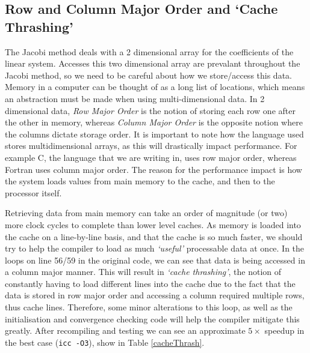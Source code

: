 \documentclass[10pt,twocolumn,a4paper]{article}
\begin{document}
\subsection{Row and Column Major Order and `Cache Thrashing'}
The Jacobi method deals with a 2 dimensional array for the coefficients of the linear system. Accesses this two dimensional array are prevalant throughout the Jacobi method, so we need to be careful about how we store/access this data. Memory in a computer can be thought of as a long list of locations, which means an abstraction must be made when using multi-dimensional data. In 2 dimensional data, \textit{Row Major Order} is the notion of storing each row one after the other in memory, whereas \textit{Column Major Order} is the opposite notion where the columns dictate storage order. It is important to note how the language used stores multidimensional arrays, as this will drastically impact performance. For example C, the language that we are writing in, uses row major order, whereas Fortran uses column major order. The reason for the performance impact is how the system loads values from main memory to the cache, and then to the processor itself. \par

Retrieving data from main memory can take an order of magnitude (or two) more clock cycles to complete than lower level caches. As memory is loaded into the cache on a line-by-line basis, and that the cache is so much faster, we should try to help the compiler to load as much \textit{`useful'} processable data at once. In the loops on line 56/59 in the original code, we can see that data is being accessed in a column major manner. This will result in \textit{`cache thrashing'}, the notion of constantly having to load different lines into the cache due to the fact that the data is stored in row major order and accessing a column required multiple rows, thus cache lines. Therefore, some minor alterations to this loop, as well as the initialisation and convergence checking code will help the compiler mitigate this greatly. After recompiling and testing we can see an approximate $5\times$ speedup in the best case (\texttt{icc -O3}), show in Table \ref{cacheThrash}.
\end{document}
